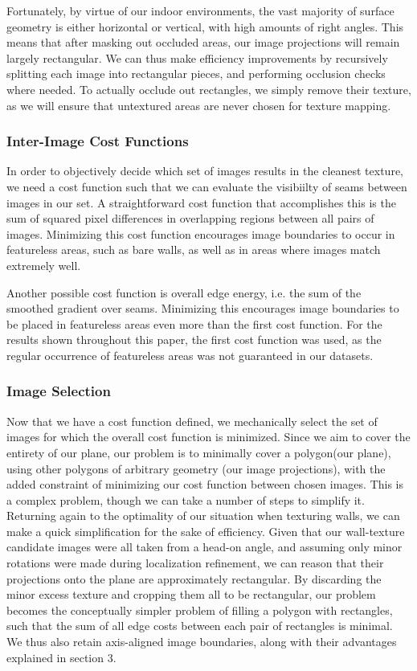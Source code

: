 \documentclass[10pt,twocolumn,letterpaper]{article}
\begin{document}
Fortunately, by virtue of our indoor environments, the vast majority
of surface geometry is either horizontal or vertical, with high
amounts of right angles. This means that after masking out occluded
areas, our image projections will remain largely rectangular. We can
thus make efficiency improvements by recursively splitting each image
into rectangular pieces, and performing occlusion checks where
needed. To actually occlude out rectangles, we simply remove their
texture, as we will ensure that untextured areas are never chosen for
texture mapping.

\subsubsection{Inter-Image Cost Functions}
In order to objectively decide which set of images results in the
cleanest texture, we need a cost function such that we can evaluate
the visibiilty of seams between images in our set. A straightforward
cost function that accomplishes this is the sum of squared pixel
differences in overlapping regions between all pairs of
images. Minimizing this cost function encourages image boundaries to
occur in featureless areas, such as bare walls, as well as in areas
where images match extremely well.

Another possible cost function is overall edge energy, i.e. the sum of
the smoothed gradient over seams. Minimizing this encourages image
boundaries to be placed in featureless areas even more than the first
cost function. For the results shown throughout this paper, the first
cost function was used, as the regular occurrence of featureless areas
was not guaranteed in our datasets.

\subsubsection{Image Selection}

Now that we have a cost function defined, we mechanically select the
set of images for which the overall cost function is minimized. Since
we aim to cover the entirety of our plane, our problem is to minimally
cover a polygon(our plane), using other polygons of arbitrary geometry
(our image projections), with the added constraint of minimizing our
cost function between chosen images. This is a complex problem, though
we can take a number of steps to simplify it. Returning again to the
optimality of our situation when texturing walls, we can make a quick
simplification for the sake of efficiency. Given that our wall-texture
candidate images were all taken from a head-on angle, and assuming
only minor rotations were made during localization refinement, we can
reason that their projections onto the plane are approximately
rectangular. By discarding the minor excess texture and cropping them
all to be rectangular, our problem becomes the conceptually simpler
problem of filling a polygon with rectangles, such that the sum of all
edge costs between each pair of rectangles is minimal. We thus also
retain axis-aligned image boundaries, along with their advantages
explained in section 3.
\end{document}
